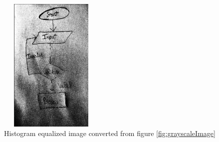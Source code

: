 \begin{figure}[h]
    \centering
    \includegraphics[width=5cm,height=6.5cm]{Images/Preprocessing/histoequal.png}
    \caption{Histogram equalized image converted from figure \ref{fig:grayscaleImage}}
    \label{fig:histoEqualized}
\end{figure}

